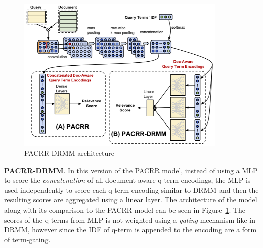 

\begin{figure}
    \centering
    \includegraphics[width=10cm]{Figures/pacrr_drmm.png}
    \caption{PACRR-DRMM architecture~\citep{pacrr_drmm_18}}
    \label{fig:pacrr_drmm_pipeline}
\end{figure}

\textbf{PACRR-DRMM}. In this version of the PACRR model, instead of using a MLP to score the \textit{concatenation} of all document-aware q-term encodings, the MLP is used independently to score each q-term encoding similar to DRMM and then the resulting scores are aggregated using a linear layer. The architecture of the model along with its comparison to the PACRR model can be seen in Figure~\ref{fig:pacrr_drmm_pipeline}. The scores of the q-terms from MLP is not weighted using a \textit{gating} mechanism like in DRMM, however since the IDF of q-term is appended to the encoding are a form of term-gating.


